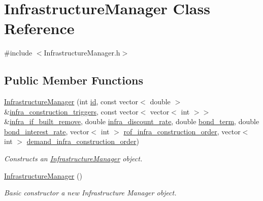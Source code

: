 \hypertarget{classInfrastructureManager}{}\section{Infrastructure\+Manager Class Reference}
\label{classInfrastructureManager}


{\ttfamily \#include $<$Infrastructure\+Manager.\+h$>$}

\subsection*{Public Member Functions}
\begin{DoxyCompactItemize}
\item 
\mbox{\hyperlink{classInfrastructureManager_a2720f467b660e0f63f265e7957ca0139}{Infrastructure\+Manager}} (int \mbox{\hyperlink{classInfrastructureManager_a9c721676ab3c35a247c818bf34fd482e}{id}}, const vector$<$ double $>$ \&\mbox{\hyperlink{classInfrastructureManager_a5b09482bd9fc258a3da82a86b157a2c3}{infra\+\_\+construction\+\_\+triggers}}, const vector$<$ vector$<$ int $>$$>$ \&\mbox{\hyperlink{classInfrastructureManager_a6505122b584011bd852a126616bf442a}{infra\+\_\+if\+\_\+built\+\_\+remove}}, double \mbox{\hyperlink{classInfrastructureManager_a44099d2523ff67773ffb853e2c9871b3}{infra\+\_\+discount\+\_\+rate}}, double \mbox{\hyperlink{classInfrastructureManager_a6c8010bc7c65fac8411431e5c7a8d3e4}{bond\+\_\+term}}, double \mbox{\hyperlink{classInfrastructureManager_ab8ddaa0ed220e29bc296470b7a905a3b}{bond\+\_\+interest\+\_\+rate}}, vector$<$ int $>$ \mbox{\hyperlink{classInfrastructureManager_a21b02e6d9ca7f90cfb289a48cec723cb}{rof\+\_\+infra\+\_\+construction\+\_\+order}}, vector$<$ int $>$ \mbox{\hyperlink{classInfrastructureManager_a9b2adee9527d11de87069901e86b540a}{demand\+\_\+infra\+\_\+construction\+\_\+order}})
\begin{DoxyCompactList}\small\item\em Constructs an \mbox{\hyperlink{classInfrastructureManager}{Infrastructure\+Manager}} object. \end{DoxyCompactList}\item 
\mbox{\hyperlink{classInfrastructureManager_a435ec4cb56238c6e1d93e37783f3a03a}{Infrastructure\+Manager}} ()
\begin{DoxyCompactList}\small\item\em Basic constructor a new Infrastructure Manager object. \end{DoxyCompactList}\item 
$$
\end{DoxyCompactItemize}
